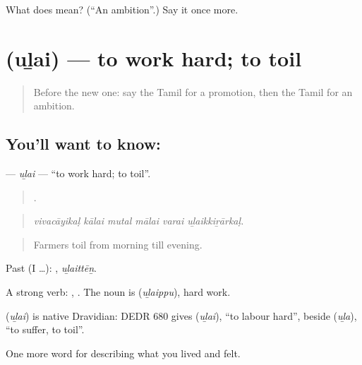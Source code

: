 \begin{tcolorbox}[breakable,colback=teal!4,colframe=teal!35!black,title={Before you move on}]
What does  mean? (\textquotedblleft{}An ambition\textquotedblright{}.) Say it once more.
\end{tcolorbox}
\section[\texorpdfstring{\ta{உழை} (uḻai)}{உழை (uḻai)}]{ (uḻai) — to work hard; to toil}

\label{lesson:TA-C509-ulai}



\begin{quote}
Before the new one: say the Tamil for a promotion, then the Tamil for an ambition.
\end{quote}

\subsection*{You'll want to know: }
\textbf{} — \emph{uḻai} — \textquotedblleft{}to work hard; to toil\textquotedblright{}.

\begin{quote}
     .
\end{quote}

\begin{quote}
\emph{vivacāyikaḷ kālai mutal mālai varai uḻaikkiṟārkaḷ.}
\end{quote}

\begin{quote}
Farmers toil from morning till evening.
\end{quote}

Past (I …): , \emph{uḻaittēṉ}.

A strong verb: , . The noun is  (\emph{uḻaippu}), hard work.

\begin{cousinweb}
\textbf{} (\emph{uḻai}) is native Dravidian: DEDR 680 gives  (\emph{uḻai}), \textquotedblleft{}to labour hard\textquotedblright{}, beside  (\emph{uḻa}), \textquotedblleft{}to suffer, to toil\textquotedblright{}.
\end{cousinweb}

\begin{grammarlens}[title={What you've built}]
One more word for describing what you lived and felt.
\end{grammarlens}

